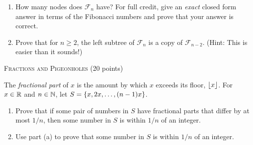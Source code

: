 \documentclass[11pt]{article}
\begin{document}
\begin{problems}
\begin{enumerate}
    \item How many nodes does $\mathcal{F}_n$ have?  For full
    credit, give an \emph{exact} closed form answer in terms of the
    Fibonacci numbers and prove that your answer is correct.

    \item Prove that for $n \ge 2$, the left subtree of $\mathcal{F}_n$ is a copy
    of $\mathcal{F}_{n-2}$. (Hint: This is easier than it sounds!)
    \end{enumerate}

    \item \textsc{Fractions and Pigeonholes} \hfill (20 points)

    The \emph{fractional part} of $x$ is the amount by which $x$
    exceeds its floor, $\lfloor x \rfloor$.  For $x \in \R$ and $n \in \N$,
    let $S = \{ x, 2x, \ldots, (n-1)x \}$.

    \begin{enumerate}
        \item Prove that if some pair of numbers in $S$ have
        fractional parts that differ by at most $1/n$, then some
        number in $S$ is within $1/n$ of an integer.

        \item Use part (a) to prove that some number in $S$ is
        within $1/n$ of an integer.

    \end{enumerate}

\end{problems}
\end{document}

